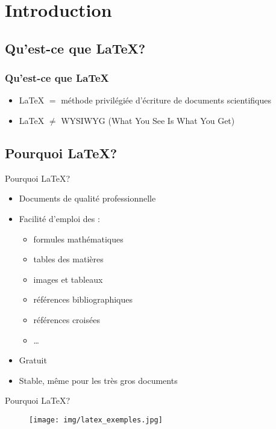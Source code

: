 \section{Introduction}
\subsection{Qu'est-ce que \LaTeX{}?}

\begin{frame}
\frametitle{Qu'est-ce que \LaTeX}
\begin{itemize}
\item \LaTeX{} $=$ méthode privilégiée d'écriture de documents scientifiques
 \vspace{0.5cm}
\item \LaTeX{} $ \neq$ WYSIWYG (What You See Is What You Get)
\end{itemize}
\end{frame}

\subsection{Pourquoi \LaTeX{}?}

\begin{frame}{Pourquoi \LaTeX{}?}
  \begin{itemize}
      \item Documents de qualité professionnelle
    \item Facilité d'emploi des :
    \begin{itemize}
        \item formules mathématiques
        \item tables des matières
        \item images et tableaux
        \item références bibliographiques
        \item références croisées
        \item \ldots{}
    \end{itemize}
    \item Gratuit
    \item Stable, même pour les très gros documents
  \end{itemize}
\end{frame}


\begin{frame}{Pourquoi \LaTeX{}?}
\begin{figure}[htbp]
\begin{center}
\texttt{[image: img/latex\_exemples.jpg]}
\end{center}
\end{figure}
\end{frame}

